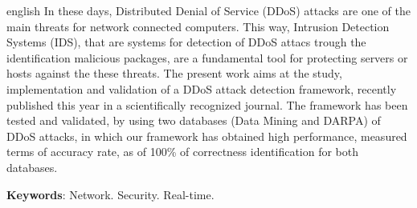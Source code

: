 \begin{resumo}[Abstract]
 \begin{otherlanguage*}{english}
 	In these days, Distributed Denial of Service (DDoS) attacks are one of the main threats for network connected computers. This way, Intrusion Detection Systems (IDS), that are systems for  detection of DDoS attacs trough the identification malicious packages, are a fundamental tool for protecting servers or hosts against the these threats. The present work aims at the study, implementation and validation of a DDoS attack detection framework, recently published this year in a scientifically recognized journal. The framework has been tested and validated, by using two databases (Data Mining and DARPA) of DDoS attacks, in which our framework has obtained high performance, measured terms of accuracy rate, as of 100\% of correctness identification for both databases.
   \noindent 
  
   \textbf{Keywords}: Network. Security. Real-time. 
 \end{otherlanguage*}
\end{resumo}